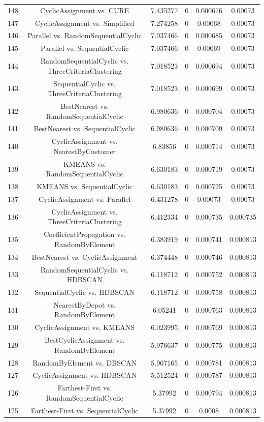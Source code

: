 \documentclass[a4paper,10pt]{article}
\begin{document}
\begin{landscape}
\begin{table}[!htp]
\begin{tabular}{cccccc}
148&CyclicAssignment vs. CURE&7.435277&0&0.000676&0.00073\\
147&CyclicAssignment vs. Simplified&7.274258&0&0.00068&0.00073\\
146&Parallel vs. RandomSequentialCyclic&7.037466&0&0.000685&0.00073\\
145&Parallel vs. SequentialCyclic&7.037466&0&0.00069&0.00073\\
144&RandomSequentialCyclic vs. ThreeCriteriaClustering&7.018523&0&0.000694&0.00073\\
143&SequentialCyclic vs. ThreeCriteriaClustering&7.018523&0&0.000699&0.00073\\
142&BestNearest vs. RandomSequentialCyclic&6.980636&0&0.000704&0.00073\\
141&BestNearest vs. SequentialCyclic&6.980636&0&0.000709&0.00073\\
140&CyclicAssignment vs. NearestByCustomer&6.83856&0&0.000714&0.00073\\
139&KMEANS vs. RandomSequentialCyclic&6.630183&0&0.000719&0.00073\\
138&KMEANS vs. SequentialCyclic&6.630183&0&0.000725&0.00073\\
137&CyclicAssignment vs. Parallel&6.431278&0&0.00073&0.00073\\
136&CyclicAssignment vs. ThreeCriteriaClustering&6.412334&0&0.000735&0.000735\\
135&CoefficientPropagation vs. RandomByElement&6.383919&0&0.000741&0.000813\\
134&BestNearest vs. CyclicAssignment&6.374448&0&0.000746&0.000813\\
133&RandomSequentialCyclic vs. HDBSCAN&6.118712&0&0.000752&0.000813\\
132&SequentialCyclic vs. HDBSCAN&6.118712&0&0.000758&0.000813\\
131&NearestByDepot vs. RandomByElement&6.05241&0&0.000763&0.000813\\
130&CyclicAssignment vs. KMEANS&6.023995&0&0.000769&0.000813\\
129&BestCyclicAssignment vs. RandomByElement&5.976637&0&0.000775&0.000813\\
128&RandomByElement vs. DBSCAN&5.967165&0&0.000781&0.000813\\
127&CyclicAssignment vs. HDBSCAN&5.512524&0&0.000787&0.000813\\
126&Farthest-First vs. RandomSequentialCyclic&5.37992&0&0.000794&0.000813\\
125&Farthest-First vs. SequentialCyclic&5.37992&0&0.0008&0.000813\\

\end{tabular}
\end{table}
\end{landscape}
\end{document}
